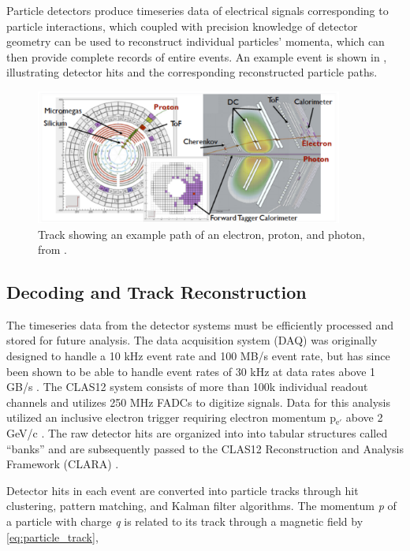 Particle detectors produce timeseries data of electrical signals corresponding to particle interactions, which coupled with precision knowledge of detector geometry can be used to reconstruct individual particles' momenta, which can then provide complete records of entire events. An example event is shown in , illustrating detector hits and the corresponding reconstructed particle paths.

\begin{figure}[htb]
    \centering
    \includegraphics[width=0.9\textwidth]{Chapters/Ch2-Experiment/recon_pid/pid_figs/example_track.png}
    \caption[Example Event Tracks]{Track showing an example path of an electron, proton, and photon, from \parencite{Battaglieri2021PresentProgram}.}
    \label{fig:example-track}
\end{figure}


\subsection{Decoding and Track Reconstruction}\label{sec:decoding_reconstruction}
    The timeseries data from the detector systems must be efficiently processed and stored for future analysis. The data acquisition system (DAQ) was originally designed to handle a 10 kHz event rate and 100 MB/s event rate, but has since been shown to be able to handle event rates of 30 kHz at data rates above 1 GB/s \parencite{Boyarinov2020TheSystem}.  The CLAS12 system consists of more than 100k individual readout channels and utilizes 250 MHz FADCs to digitize signals. Data for this analysis utilized an inclusive electron trigger requiring electron momentum p$_{\mathrm{e'}}$ above 2 GeV/c \parencite{Raydo2020TheSystem}. The raw detector hits are organized into into tabular structures called ``banks'' and are subsequently passed to the CLAS12 Reconstruction and Analysis Framework (CLARA) \parencite{Gyurgyan2016CLARA:Framework}.

    Detector hits in each event are converted into particle tracks through hit clustering, pattern matching, and Kalman filter algorithms. The momentum \textit{p} of a particle with charge \textit{q} is related to its track through a magnetic field by \eqref{eq:particle_track},
    
